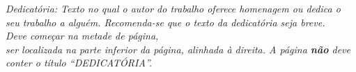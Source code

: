 
\begin{dedicatoria}

  \clearpage

  \vspace*{\fill}

  \hfill
  \begin{minipage}{0.5\textwidth}
    \raggedleft
    \textit{Dedicatória: Texto no qual o autor do trabalho oferece homenagem ou dedica o seu trabalho a alguém. Recomenda-se que o texto da dedicatória seja breve.} \\
    \textit{Deve começar na metade de página,} \\
    \textit{ser localizada na parte inferior da página, alinhada à direita. A página \textbf{não} deve conter o título ``DEDICATÓRIA''.}
  \end{minipage}

  \clearpage

\end{dedicatoria}
